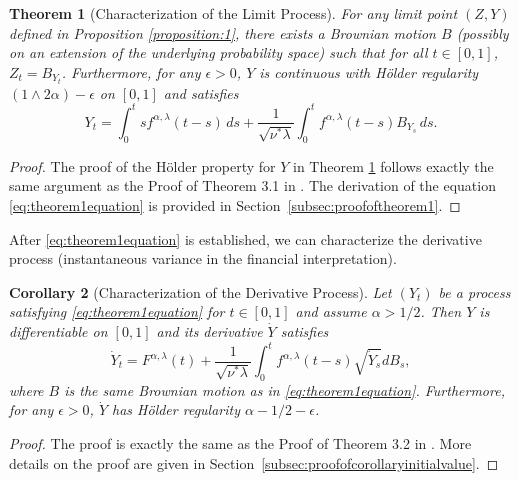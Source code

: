 \documentclass[letterpaper]{article}
\numberwithin{equation}{section}
\newtheorem{theorem}{Theorem}[section]
\newtheorem{corollary}[theorem]{Corollary}
\theoremstyle{definition}
\theoremstyle{remark}
\begin{document}
\begin{theorem}[Characterization of the Limit Process]\label{theorem:1}
  For any limit point $(Z,Y)$ defined in Proposition \ref{proposition:1}, {there exists a Brownian motion $B$ (possibly on an extension of the underlying probability space) such that for all $t \in [0,1]$,}
  {$Z_t = B_{Y_t}$.}
  Furthermore, for any $\epsilon > 0$, $Y$ is continuous with H\"older regularity $(1 \wedge 2\alpha) - \epsilon$ on $[0,1]$ and satisfies
  \begin{equation}\label{eq:theorem1equation}
    Y_t = \int_0^t s f^{\alpha,\lambda}(t - s) \, ds + \frac{1}{\sqrt{\nu^* \lambda}} \int_0^t f^{\alpha,\lambda}(t - s) B_{Y_s} \, ds.
  \end{equation}
\end{theorem}

\begin{proof}
  The proof of the H\"older property for $Y$ in Theorem \ref{theorem:1} follows exactly the same argument as the Proof of Theorem 3.1 in \cite{jaisson2016rough}. The derivation of the equation \eqref{eq:theorem1equation} is provided in Section~\ref{subsec:proofoftheorem1}. 
\end{proof}

After \eqref{eq:theorem1equation} is established, we can characterize the derivative process (instantaneous variance in the financial interpretation).

\begin{corollary}[Characterization of the Derivative Process]\label{corollary:derivativesde}
  Let $(Y_t)$ be a process satisfying \eqref{eq:theorem1equation} for $t\in[0,1]$ and assume $\alpha>1/2$. Then $Y$ is differentiable on $[0,1]$ and its derivative $\dot{Y}$ satisfies
  \[
    \dot{Y}_t=F^{\alpha,\lambda}(t)+\frac1{\sqrt{\nu^*\lambda}}\int_0^tf^{\alpha,\lambda}(t-s)\sqrt{\dot{Y}_s}dB_s,
  \]
  where $B$ is the same Brownian motion as in \eqref{eq:theorem1equation}. Furthermore, for any $\epsilon>0$, $\dot{Y}$ has H\"older regularity $\alpha-1/2-\epsilon$.
\end{corollary}
\begin{proof}
The proof is exactly the same as the Proof of Theorem 3.2 in \cite{jaisson2016rough}. {More details on the proof are given in Section~\ref{subsec:proofofcorollaryinitialvalue}.}
\end{proof}
\end{document}
